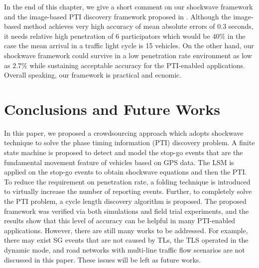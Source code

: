 \documentclass[final,oneside,onecolumn,12pt,a4paper]{book}%
\begin{document}
In the end of this chapter, we give a short comment on our shockwave framework
and the image-based PTI discovery framework proposed in
\cite{Koukoumidis2011SignalGuru}. Although the image-based method achieves
very high accuracy of mean absolute errors of $0.3$ seconds, it needs relative
high penetration of $6$ participators which would be $40\%$ in the case the
mean arrival in a traffic light cycle is 15 vehicles. On the other hand, our
shockwave framework could survive in a low penetration rate environment as low
as $2.7\%$ while sustaining acceptable accuracy for the PTI-enabled
applications. Overall speaking, our framework is practical and ecnomic.

\chapter{Conclusions and Future Works}

\label{cha:Conclusions} In this paper, we proposed a crowdsourcing approach
which adopts shockwave technique to solve the phase timing information (PTI)
discovery problem. A finite state machine is proposed to detect and model the
stop-go events that are the fundamental movement feature of vehicles based on
GPS data. The LSM is applied on the stop-go events to obtain shockwave
equations and then the PTI. To reduce the requirement on penetration rate, a
folding technique is introduced to virtually increase the number of reporting
events. Further, to completely solve the PTI problem, a cycle length discovery
algorithm is proposed. The proposed framework was verified via both
simulations and field trial experiments, and the results show that this level
of accuracy can be helpful in many PTI-enabled applications. However, there
are still many works to be addressed. For example, there may exist SG events
that are not caused by TLs, the TLS operated in the dynamic mode, and road
networks with multi-line traffic flow scenarios are not discussed in this
paper. These issues will be left as future works.








{}





\bigskip{}
\end{document}

